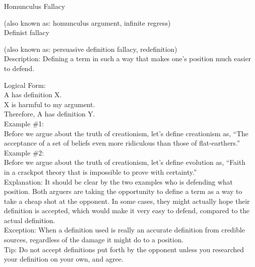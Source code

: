 \documentclass[a4paper,12pt,single,pdftex]{scrartcl}
\begin{document}
Homunculus Fallacy
    
      (also known as: homunculus argument, infinite regress)
    \\

  

Definist fallacy
    
      (also known as: persuasive definition fallacy, redefinition)
    \\

  
    Description: Defining a term in such a way that makes one’s position much easier to defend.

    
      Logical Form:
    \\

    
      A has definition X.
    \\

    
      X is harmful to my argument.
    \\

    
      Therefore, A has definition Y.
    \\

    
      Example \#1:
    \\

    
      Before we argue about the truth of creationism, let’s define creationism as, “The acceptance of a set of beliefs even more ridiculous than those of flat-earthers.”
    \\

    
      Example \#2:
    \\

    
      Before we argue about the truth of creationism, let’s define evolution as, “Faith in a crackpot theory that is impossible to prove with certainty.”
    \\

    
      Explanation: It should be clear by the two examples who is defending what position.  Both arguers are taking the opportunity to define a term as a way to take a cheap shot at the opponent.  In some cases, they might actually hope their definition is accepted, which would make it very easy to defend, compared to the actual definition.
    \\

    
      Exception: When a definition used is really an accurate definition from credible sources, regardless of the damage it might do to a position.
    \\

    
      Tip: Do not accept definitions put forth by the opponent unless you researched your definition on your own, and agree.
    \\
\end{document}
